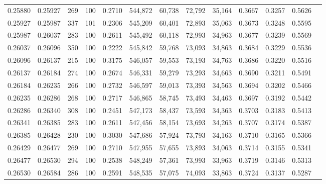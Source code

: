 \begin{tabular}{rrrrrrrrrrrrr}
0.25880 & 0.25927 &   269 & 100 &                                     0.2710 & 544,872 &  60,738 &  72,792 &  35,164 & 0.3667 & 0.3257 & 0.5626 \\
0.25927 & 0.25987 &   337 & 101 &                                     0.2306 & 545,209 &  60,401 &  72,893 &  35,063 & 0.3673 & 0.3248 & 0.5595 \\
0.25987 & 0.26037 &   283 & 100 &                                     0.2611 & 545,492 &  60,118 &  72,993 &  34,963 & 0.3677 & 0.3239 & 0.5569 \\
0.26037 & 0.26096 &   350 & 100 &                                     0.2222 & 545,842 &  59,768 &  73,093 &  34,863 & 0.3684 & 0.3229 & 0.5536 \\
0.26096 & 0.26137 &   215 & 100 &                                     0.3175 & 546,057 &  59,553 &  73,193 &  34,763 & 0.3686 & 0.3220 & 0.5516 \\
0.26137 & 0.26184 &   274 & 100 &                                     0.2674 & 546,331 &  59,279 &  73,293 &  34,663 & 0.3690 & 0.3211 & 0.5491 \\
0.26184 & 0.26235 &   266 & 100 &                                     0.2732 & 546,597 &  59,013 &  73,393 &  34,563 & 0.3694 & 0.3202 & 0.5466 \\
0.26235 & 0.26286 &   268 & 100 &                                     0.2717 & 546,865 &  58,745 &  73,493 &  34,463 & 0.3697 & 0.3192 & 0.5442 \\
0.26286 & 0.26340 &   308 & 100 &                                     0.2451 & 547,173 &  58,437 &  73,593 &  34,363 & 0.3703 & 0.3183 & 0.5413 \\
0.26341 & 0.26385 &   283 & 100 &                                     0.2611 & 547,456 &  58,154 &  73,693 &  34,263 & 0.3707 & 0.3174 & 0.5387 \\
0.26385 & 0.26428 &   230 & 100 &                                     0.3030 & 547,686 &  57,924 &  73,793 &  34,163 & 0.3710 & 0.3165 & 0.5366 \\
0.26429 & 0.26477 &   269 & 100 &                                     0.2710 & 547,955 &  57,655 &  73,893 &  34,063 & 0.3714 & 0.3155 & 0.5341 \\
0.26477 & 0.26530 &   294 & 100 &                                     0.2538 & 548,249 &  57,361 &  73,993 &  33,963 & 0.3719 & 0.3146 & 0.5313 \\
0.26530 & 0.26584 &   286 & 100 &                                     0.2591 & 548,535 &  57,075 &  74,093 &  33,863 & 0.3724 & 0.3137 & 0.5287 \\

\end{tabular}
